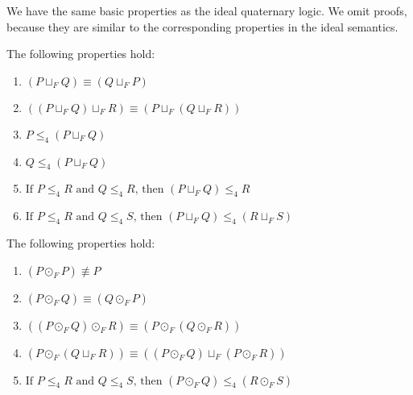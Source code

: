 We have the same basic properties as the ideal quaternary logic.  We
omit proofs, because they are similar to the corresponding properties
in the ideal semantics.
\begin{lemma}
  \label{lemma:basic_properties_for_choice}
  The following properties hold:
  \begin{enumerate}
  \item $(P \sqcup_F Q) \equiv (Q \sqcup_F P)$\\[-5px]
  \item $((P \sqcup_F Q) \sqcup_F R) \equiv (P \sqcup_F (Q \sqcup_F R))$\\[-5px]
  \item $P \leq_4 (P \sqcup_F Q)$\\[-5px]
  \item $Q \leq_4 (P \sqcup_F Q)$\\[-5px]
  \item $\text{If }P \leq_4 R \text{ and } Q \leq_4 R \text{, then } (P \sqcup_F Q) \leq_4 R$\\[-5px]
  \item $\text{If }P \leq_4 R \text{ and } Q \leq_4 S \text{, then } (P \sqcup_F Q) \leq_4 (R \sqcup_F S)$
  \end{enumerate}
\end{lemma}

\begin{lemma}
  \label{lemma:basic_properties_for_parallel}
  The following properties hold:
  \begin{enumerate}
  \item $(P \odot_F P) \not\equiv P$\\[-5px]
  \item $(P \odot_F Q) \equiv (Q \odot_F P)$\\[-5px]
  \item $((P \odot_F Q) \odot_F R) \equiv (P \odot_F (Q \odot_F R))$\\[-5px]
  \item $(P \odot_F (Q \sqcup_F R)) \equiv ((P \odot_F Q) \sqcup_F (P \odot_F R))$\\[-5px]
  \item $\text{If }P \leq_4 R \text{ and } Q \leq_4 S \text{, then } (P \odot_F Q) \leq_4 (R \odot_F S)$
  \end{enumerate}
\end{lemma}

